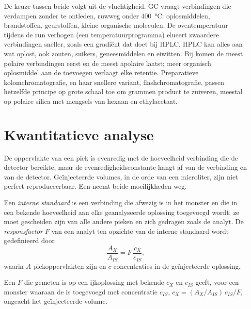 De keuze tussen beide volgt uit de vluchtigheid. GC vraagt verbindingen die verdampen zonder te ontleden,
ruwweg onder \qty{400}{\degreeCelsius}: oplosmiddelen, brandstoffen, geurstoffen, kleine organische moleculen. De
oventemperatuur tijdens de run verhogen (een temperatuurprogramma) elueert zwaardere verbindingen sneller, zoals een gradiënt
dat doet bij HPLC. HPLC kan alles aan wat oplost, ook zouten, suikers, geneesmiddelen en eiwitten. Bij
 komen de meest polaire verbindingen eerst en de meest apolaire laatst; meer organisch
oplosmiddel aan de  toevoegen verlaagt elke retentie. Preparatieve kolomchromatografie, en haar snellere
variant, flashchromatografie, passen hetzelfde principe op grote schaal toe om grammen product te zuiveren,
meestal op polaire silica met mengsels van hexaan en ethylacetaat.

\section{Kwantitatieve analyse}

De oppervlakte van een piek is evenredig met de hoeveelheid verbinding die de detector bereikte, maar de
evenredigheidsconstante hangt af van de verbinding en van de detector. Geïnjecteerde volumes, in de orde van
een microliter, zijn niet perfect reproduceerbaar. Een  neemt beide moeilijkheden weg.

\begin{definition}\label{def:b2:chromatography:quantitative}
Een \emph{interne standaard} is een verbinding die afwezig is in het monster en die in een
bekende hoeveelheid aan elke geanalyseerde oplossing toegevoegd wordt; ze moet gescheiden zijn van alle andere pieken en zich gedragen zoals de
analyt. De \emph{responsfactor} $F$ van een analyt ten opzichte van de interne
standaard wordt gedefinieerd door
\begin{equation*}
\frac{A_X}{A_{IS}} = F\,\frac{c_X}{c_{IS}},
\end{equation*}
waarin $A$ piekoppervlakten zijn en $c$ concentraties in de geïnjecteerde oplossing.
\end{definition}

\begin{proposition}\label{prop:b2:chromatography:internal-standard}
Een $F$ die gemeten is op een ijkoplossing met bekende $c_X$ en $c_{IS}$ geeft, voor een monster waaraan de
 is toegevoegd met concentratie $c_{IS}$, $c_X = (A_X/A_{IS})\,c_{IS}/F$, ongeacht het geïnjecteerde volume.
\end{proposition}

